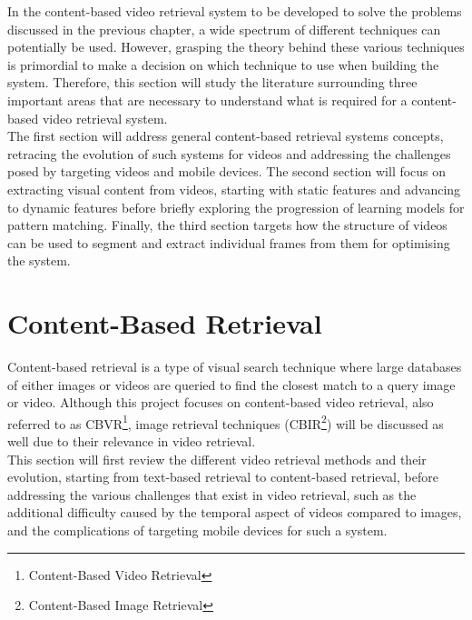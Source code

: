 In the content-based video retrieval system to be developed to solve the problems discussed in the previous chapter, a wide spectrum of different techniques can potentially be used. However, grasping the theory behind these various techniques is primordial to make a decision on which technique to use when building the system. Therefore, this section will study the literature surrounding three important areas that are necessary to understand what is required for a content-based video retrieval system.\\

The first section will address general content-based retrieval systems concepts, retracing the evolution of such systems for videos and addressing the challenges posed by targeting videos and mobile devices. The second section will focus on extracting visual content from videos, starting with static features and advancing to dynamic features before briefly exploring the progression of learning models for pattern matching. Finally, the third section targets how the structure of videos can be used to segment and extract individual frames from them for optimising the system.

\section{Content-Based Retrieval}

Content-based retrieval is a type of visual search technique where large databases of either images or videos are queried to find the closest match to a query image or video. Although this project focuses on content-based video retrieval, also referred to as CBVR\footnote{Content-Based Video Retrieval}, image retrieval techniques (CBIR\footnote{Content-Based Image Retrieval}) will be discussed as well due to their relevance in video retrieval.\\

This section will first review the different video retrieval methods and their evolution, starting from text-based retrieval to content-based retrieval, before addressing the various challenges that exist in video retrieval, such as the additional difficulty caused by the temporal aspect of videos compared to images, and the complications of targeting mobile devices for such a system.

